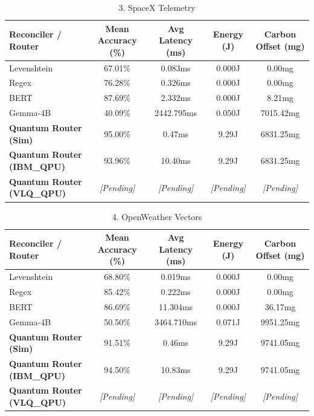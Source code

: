 
\begin{table}[htbp]
  \centering
  \caption{3. SpaceX Telemetry}
  \label{tab:3__spacex_telemetry}
  \begin{tabular}{lcccc}
    \hline
    \textbf{Reconciler / Router} & \textbf{Mean Accuracy (\%)} & \textbf{Avg Latency (ms)} & \textbf{Energy (J)} & \textbf{Carbon Offset (mg)} \\
    \hline
    Levenshtein & 67.01\% & 0.083ms & 0.000J & 0.00mg \\
    Regex & 76.28\% & 0.326ms & 0.000J & 0.00mg \\
    BERT & 87.69\% & 2.332ms & 0.000J & 8.21mg \\
    Gemma-4B & 40.09\% & 2442.795ms & 0.050J & 7015.42mg \\
    \textbf{Quantum Router (Sim)} & 95.00\% & 0.47ms & 9.29J & 6831.25mg \\
    \textbf{Quantum Router (IBM\_QPU)} & 93.96\% & 10.40ms & 9.29J & 6831.25mg \\
    \textbf{Quantum Router (VLQ\_QPU)} & \textit{[Pending]} & \textit{[Pending]} & \textit{[Pending]} & \textit{[Pending]} \\
    \hline
  \end{tabular}
\end{table}



\begin{table}[htbp]
  \centering
  \caption{4. OpenWeather Vectors}
  \label{tab:4__openweather_vectors}
  \begin{tabular}{lcccc}
    \hline
    \textbf{Reconciler / Router} & \textbf{Mean Accuracy (\%)} & \textbf{Avg Latency (ms)} & \textbf{Energy (J)} & \textbf{Carbon Offset (mg)} \\
    \hline
    Levenshtein & 68.80\% & 0.019ms & 0.000J & 0.00mg \\
    Regex & 85.42\% & 0.222ms & 0.000J & 0.00mg \\
    BERT & 86.69\% & 11.304ms & 0.000J & 36.17mg \\
    Gemma-4B & 50.50\% & 3464.710ms & 0.071J & 9951.25mg \\
    \textbf{Quantum Router (Sim)} & 91.51\% & 0.46ms & 9.29J & 9741.05mg \\
    \textbf{Quantum Router (IBM\_QPU)} & 94.50\% & 10.83ms & 9.29J & 9741.05mg \\
    \textbf{Quantum Router (VLQ\_QPU)} & \textit{[Pending]} & \textit{[Pending]} & \textit{[Pending]} & \textit{[Pending]} \\
    \hline
  \end{tabular}
\end{table}


